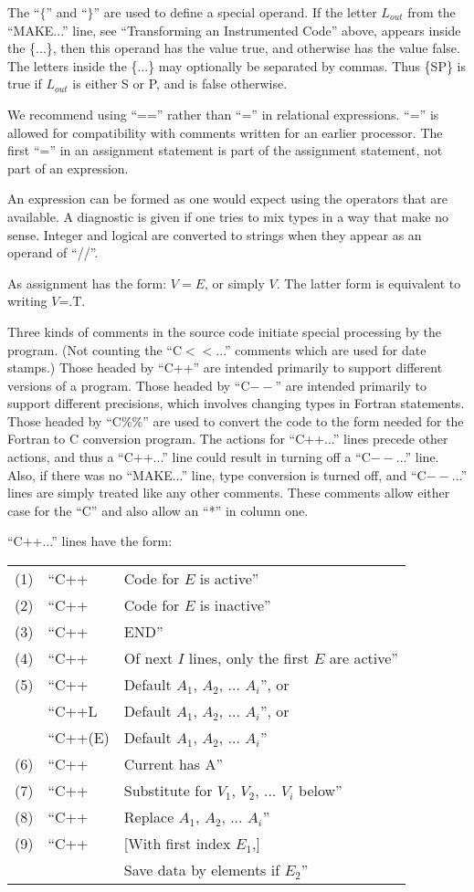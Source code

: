 \documentclass[twoside]{MATH77}
\begin{document}
The ``$\{$'' and ``$\}$'' are used to define a special operand.  If
the letter $L_{out}$ from the ``MAKE...'' line, see ``Transforming an
Instrumented Code'' above, appears inside the \{...\}, then this
operand has the value true, and otherwise has the value false.  The
letters inside the \{...\} may optionally be separated by commas.
Thus \{SP\} is true if $L_{out}$ is either S or P, and is false
otherwise.

We recommend using ``=='' rather than ``='' in relational
expressions.  ``='' is allowed for compatibility with comments
written for an earlier processor. The first ``='' in an assignment
statement is part of the assignment statement, not part of an
expression.

An expression can be formed as one would expect using the operators
that are available.  A diagnostic is given if one tries to mix types
in a way that make no sense.  Integer and logical are converted to
strings when they appear as an operand of ``//''.

As assignment has the form: $V = E$, or simply $V$.  The latter form is
equivalent to writing $V$=.T.

Three kinds of comments in the source code initiate special processing by
the program.  (Not counting the ``C$<<$...'' comments which are used for
date stamps.) Those headed by ``C++'' are intended primarily to support
different versions of a program.  Those headed by ``C$--$'' are intended
primarily to support different precisions, which involves changing types in
Fortran statements.  Those headed by ``C\%\%'' are used to convert the
code to the form needed for the Fortran to C conversion program.  The
actions for ``C++...'' lines precede other actions, and thus a ``C++...''
line could result in turning off a ``C$--$...'' line.  Also, if there was
no ``MAKE...'' line, type conversion is turned off, and ``C$--$...'' lines
are simply treated like any other comments.  These comments allow either
case for the ``C'' and also allow an ``*'' in column one.

``C++...'' lines have the form:

\begin{tabular}{@{}l@{ }l@{ }l}
(1) & ``C++ & Code for $E$ is active''\\
(2) & ``C++ & Code for $E$ is inactive''\\
(3) & ``C++ & END''\\
(4) & ``C++ & Of next $I$ lines, only the first $E$ are active''\\
(5) & ``C++ & Default $A_1$, $A_2$, ... $A_i$'', or\\
    & ``C++L & Default $A_1$, $A_2$, ... $A_i$'', or\\
    & ``C++(E) & Default $A_1$, $A_2$, ... $A_i$''\\
(6) & ``C++ & Current has A''\\
(7) & ``C++ & Substitute for $V_1$, $V_2$, ... $V_i$ below''\\
(8) & ``C++ & Replace $A_1$, $A_2$, ... $A_i$''\\
(9) & ``C++ & [With first index $E_1$,]\\
    &       & Save data by elements if $E_2$''
\end{tabular}
\end{document}
